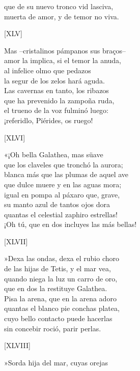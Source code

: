 \documentclass[11pt,a4paper,twoside]{article}
\begin{document}
que de su nuevo tronco vid lasciva,\\
muerta de amor, y de temor no viva.\par\pend
%
\begin{center}
	[XLV]
\end{center}\pstart
Mas --cristalinos pámpanos sus braços--\\
amor la implica, si el temor la anuda,\\
al infelice olmo que pedazos\\
la segur de los zelos hará aguda.\\
Las cavernas en tanto, los ribazos\\
que ha prevenido la zampoña ruda,\\
el trueno de la voz fulminó luego:\\
¡referidlo, Pïérides, os ruego!\par\pend
%
\begin{center}
	[XLVI]
\end{center}\pstart
«¡Oh bella Galathea, mas süave\\
que los claveles que tronchó la aurora;\\
blanca más que las plumas de aquel ave\\
que dulce muere y en las aguas mora;\\
igual en pompa al páxaro que, grave,\\
su manto azul de tantos ojos dora\\
quantas el celestial zaphiro estrellas!\\
¡Oh tú, que en dos incluyes las más bellas!\par\pend
%
\begin{center}
	[XLVII]
\end{center}\pstart
»Dexa las ondas, dexa el rubio choro\\
de las hijas de Tetis, y el mar vea,\\
quando niega la luz un carro de oro,\\
que en dos la restituye Galathea.\\
Pisa la arena, que en la arena adoro\\
quantas el blanco pie conchas platea,\\
cuyo bello contacto puede hacerlas\\
sin concebir roció, parir perlas.\par\pend
\relax
\vfill
\newpage
%
\begin{center}
	[XLVIII]
\end{center}\pstart
»Sorda hija del mar, cuyas orejas\\
\end{document}
